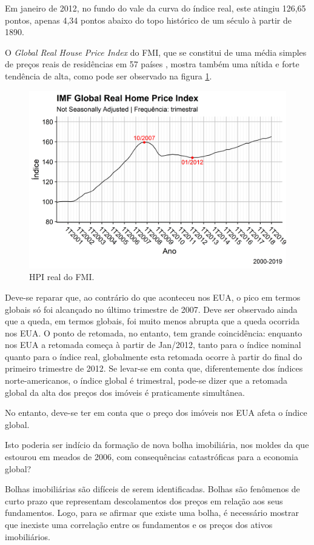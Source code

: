 \documentclass[
	12pt,				%
	oneside,			%
	a4paper,			%
	chapter=TITLE,		%
	section=TITLE,		%
	english,			%
	brazil				%
	]{abntex2}
\begin{document}
Em janeiro de 2012, no fundo do vale da curva do índice real, este
atingiu 126,65 pontos, apenas 4,34 pontos abaixo do topo histórico de um
século à partir de 1890.

O \emph{Global Real House Price Index} do \gls{FMI}, que se constitui de
uma média simples de preços reais de residências em 57 países
\autocite{fmitwa}, mostra também uma nítida e forte tendência de alta,
como pode ser observado na figura \ref{fig:global-rhpi}.
\begin{figure}[H]

{\centering \includegraphics[width=0.7\linewidth]{images/global-rhpi-1} 

}

\caption{HPI real do FMI.}\label{fig:global-rhpi}
\end{figure}
Deve-se reparar que, ao contrário do que aconteceu nos EUA, o pico em
termos globais só foi alcançado no último trimestre de 2007. Deve ser
observado ainda que a queda, em termos globais, foi muito menos abrupta
que a queda ocorrida nos EUA. O ponto de retomada, no entanto, tem
grande coincidência: enquanto nos EUA a retomada começa à partir de
Jan/2012, tanto para o índice nominal quanto para o índice real,
globalmente esta retomada ocorre à partir do final do primeiro trimestre
de 2012. Se levar-se em conta que, diferentemente dos índices
norte-americanos, o índice global é trimestral, pode-se dizer que a
retomada global da alta dos preços dos imóveis é praticamente
simultânea.

No entanto, deve-se ter em conta que o preço dos imóveis nos EUA afeta o
índice global.

Isto poderia ser indício da formação de nova bolha imobiliária, nos
moldes da que estourou em meados de 2006, com consequências
catastróficas para a economia global?

Bolhas imobiliárias são difíceis de serem identificadas. Bolhas são
fenômenos de curto prazo que representam descolamentos dos preços em
relação aos seus fundamentos. Logo, para se afirmar que existe uma
bolha, é necessário mostrar que inexiste uma correlação entre os
fundamentos e os preços dos ativos imobiliários.
\end{document}
